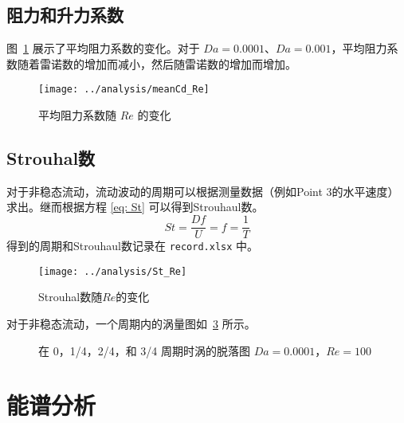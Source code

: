 \subsection{阻力和升力系数}

图~\ref{fig: meanCd} 展示了平均阻力系数的变化。对于 $Da=0.0001$、$Da=0.001$，平均阻力系数随着雷诺数的增加而减小，然后随雷诺数的增加而增加。

\begin{figure}
	\centering
	\texttt{[image: ../analysis/meanCd\_Re]}
	\caption{平均阻力系数随 $Re$ 的变化}
	\label{fig: meanCd}
\end{figure}

\subsection{Strouhal数}

对于非稳态流动，流动波动的周期可以根据测量数据（例如Point 3的水平速度）求出。继而根据方程 \eqref{eq: St} 可以得到Strouhaul数。
\begin{equation}\label{eq: St}
	St = \frac{Df}{U} = f = \frac{1}{T}
\end{equation}
得到的周期和Strouhaul数记录在 \texttt{record.xlsx} 中。

\begin{figure}
	\centering
	\texttt{[image: ../analysis/St\_Re]}
	\caption{Strouhal数随$Re$的变化}
	\label{fig: St}
\end{figure}

对于非稳态流动，一个周期内的涡量图如~\ref{fig: 4*vortex} 所示。

\begin{figure}
	\centering
	\begin{minipage}{\textwidth}
		\centering
	\end{minipage}
	\centering
	\begin{minipage}{\textwidth}
		\centering
	\end{minipage}
	\caption{在 0，1/4，2/4，和 3/4 周期时涡的脱落图 $Da=0.0001$，$Re=100$}
	\label{fig: 4*vortex}
\end{figure}

\section{能谱分析} %

